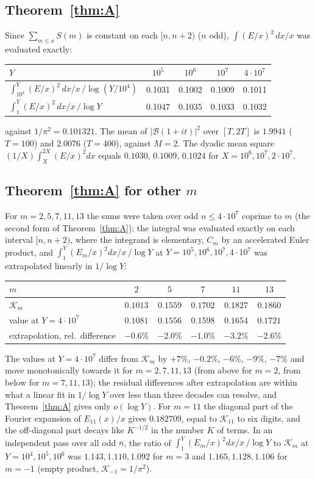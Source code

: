 \documentclass[11pt]{amsart}
\theoremstyle{remark}
\newcommand{\cB}{\mathcal{B}}
\begin{document}
\subsection*{Theorem~\ref{thm:A}}
Since $\sum_{m\le x}S(m)$ is constant on each $[n,n+2)$ ($n$ odd), $\int(E/x)^2\,dx/x$ was evaluated exactly:
\begin{center}
\begin{tabular}{lcccc}
\toprule
$Y$ & $10^5$ & $10^6$ & $10^7$ & $4\cdot10^7$\\
\midrule
$\int_{10^4}^Y(E/x)^2\,dx/x\,\big/\log(Y/10^4)$ & 0.1031 & 0.1002 & 0.1009 & 0.1011\\
$\int_1^Y(E/x)^2\,dx/x\,\big/\log Y$ & 0.1047 & 0.1035 & 0.1033 & 0.1032\\
\bottomrule
\end{tabular}
\end{center}
against $1/\pi^2=0.101321$. The mean of $|\cB(1+it)|^2$ over $[T,2T]$ is $1.9941$ ($T=100$) and $2.0076$ ($T=400$), against $M=2$. The dyadic mean square $(1/X)\int_X^{2X}(E/x)^2dx$ equals $0.1030$, $0.1009$, $0.1024$ for $X=10^6,10^7,2\cdot10^7$.

\subsection*{Theorem~\ref{thm:A} for other $m$}
For $m=2,5,7,11,13$ the sums were taken over odd $n\le4\cdot10^7$ coprime to $m$ (the second form of Theorem~\ref{thm:A}); the integral was evaluated exactly on each interval $[n,n+2)$, where the integrand is elementary, $C_m$ by an accelerated Euler product, and $\int_1^Y(E_m/x)^2dx/x\,/\log Y$ at $Y=10^5,10^6,10^7,4\cdot10^7$ was extrapolated linearly in $1/\log Y$:
\begin{center}
\begin{tabular}{lccccc}
\toprule
$m$ & $2$ & $5$ & $7$ & $11$ & $13$\\
\midrule
$\mathcal K_m$ & $0.1013$ & $0.1559$ & $0.1702$ & $0.1827$ & $0.1860$\\
value at $Y=4\cdot10^7$ & $0.1081$ & $0.1556$ & $0.1598$ & $0.1654$ & $0.1721$\\
extrapolation, rel.\ difference & $-0.6\%$ & $-2.0\%$ & $-1.0\%$ & $-3.2\%$ & $-2.6\%$\\
\bottomrule
\end{tabular}
\end{center}
The values at $Y=4\cdot10^7$ differ from $\mathcal K_m$ by $+7\%$, $-0.2\%$, $-6\%$, $-9\%$, $-7\%$ and move monotonically towards it for $m=2,7,11,13$ (from above for $m=2$, from below for $m=7,11,13$); the residual differences after extrapolation are within what a linear fit in $1/\log Y$ over less than three decades can resolve, and Theorem~\ref{thm:A} gives only $o(\log Y)$. For $m=11$ the diagonal part of the Fourier expansion of $E_{11}(x)/x$ gives $0.182709$, equal to $\mathcal K_{11}$ to six digits, and the off-diagonal part decays like $K^{-1/2}$ in the number $K$ of terms. In an independent pass over all odd $n$, the ratio of $\int_1^Y(E_m/x)^2dx/x\,/\log Y$ to $\mathcal K_m$ at $Y=10^4,10^5,10^6$ was $1.143,1.110,1.092$ for $m=3$ and $1.165,1.128,1.106$ for $m=-1$ (empty product, $\mathcal K_{-1}=1/\pi^2$).
\end{document}
